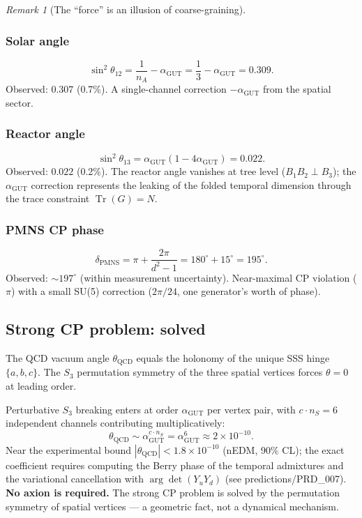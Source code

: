 \documentclass[12pt]{article}
\theoremstyle{remark}
\newtheorem{remark}[theorem]{Remark}
\theoremstyle{definition}
\newcommand{\tr}{\operatorname{Tr}}
\newcommand{\agut}{\alpha_{\mathrm{GUT}}}
\begin{document}
\begin{remark}[The ``force'' is an illusion of coarse-graining]
\subsubsection{Solar angle}
\begin{equation}
\sin^2\theta_{12} = \frac{1}{n_A} - \agut = \frac{1}{3} - \agut = 0.309.
\end{equation}
Observed: $0.307$ (0.7\%). A single-channel correction $-\agut$ from the spatial sector.

\subsubsection{Reactor angle}
\begin{equation}
\sin^2\theta_{13} = \agut(1 - 4\agut) = 0.022.
\end{equation}
Observed: $0.022$ (0.2\%). The reactor angle vanishes at tree level ($B_1 B_2 \perp B_3$); the $\agut$ correction represents the leaking of the folded temporal dimension through the trace constraint $\tr(G) = N$.

\subsubsection{PMNS CP phase}
\begin{equation}
\delta_\text{PMNS} = \pi + \frac{2\pi}{d^2 - 1} = 180^\circ + 15^\circ = 195^\circ.
\end{equation}
Observed: $\sim 197^\circ$ (within measurement uncertainty). Near-maximal CP violation ($\pi$) with a small SU(5) correction ($2\pi/24$, one generator's worth of phase).

\subsection{Strong CP problem: solved}

The QCD vacuum angle $\theta_\text{QCD}$ equals the holonomy of the unique SSS hinge $\{a, b, c\}$. The $S_3$ permutation symmetry of the three spatial vertices forces $\theta = 0$ at leading order.

Perturbative $S_3$ breaking enters at order $\alpha_\text{GUT}$ per vertex pair, with $c \cdot n_S = 6$ independent channels contributing multiplicatively:
\begin{equation}
\theta_\text{QCD} \sim \alpha_\text{GUT}^{c \cdot n_S} = \alpha_\text{GUT}^6 \approx 2 \times 10^{-10}.
\end{equation}
Near the experimental bound $|\theta_\text{QCD}| < 1.8 \times 10^{-10}$ (nEDM, 90\% CL); the exact coefficient requires computing the Berry phase of the temporal admixtures and the variational cancellation with $\arg\det(Y_u Y_d)$ (see predictions/PRD\_007).  \textbf{No axion is required.} The strong CP problem is solved by the permutation symmetry of spatial vertices --- a geometric fact, not a dynamical mechanism.


\end{remark}
\end{document}
